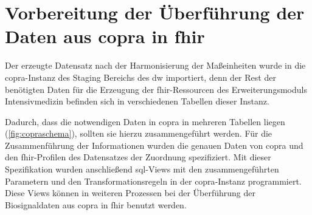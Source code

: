 \section[Vorbereitung der Überführung der Daten aus \acs{copra} in \acs{fhir}]{ Vorbereitung der Überführung der Daten aus \acs{copra} in \acs{fhir}} \label{sec:docutransfer}

Der erzeugte Datensatz nach der Harmonisierung der Maßeinheiten wurde in die \ac{copra}-Instanz des Staging Bereichs des \ac{dw} importiert, denn der Rest der benötigten Daten für die Erzeugung der \ac{fhir}-Ressourcen des Erweiterungsmoduls \glqq Intensivmedizin\grqq{} befinden sich in verschiedenen Tabellen dieser Instanz. 

Dadurch, dass die notwendigen Daten in \ac{copra} in mehreren Tabellen liegen (\ref{fig:copraschema}), sollten sie hierzu zusammengeführt werden. Für die Zusammenführung der Informationen wurden die genauen Daten von \ac{copra} und den \ac{fhir}-Profilen des Datensatzes der Zuordnung spezifiziert. Mit dieser Spezifikation wurden anschließend \ac{sql}-Views mit den zusammengeführten Parametern und den Transformationsregeln in der \ac{copra}-Instanz programmiert. Diese Views können in weiteren Prozessen bei der Überführung der Biosignaldaten aus \ac{copra} in \ac{fhir} benutzt werden.